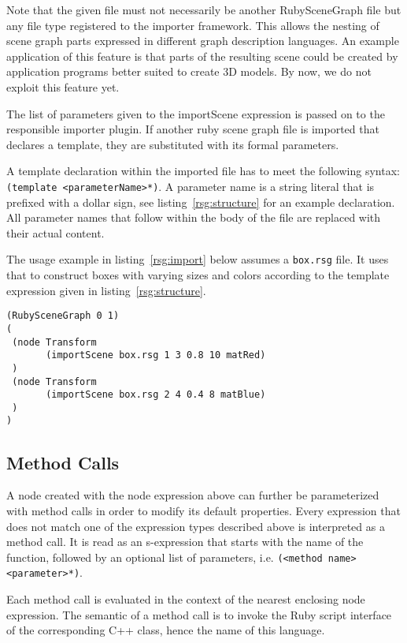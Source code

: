 Note that the given file must not necessarily be another
RubySceneGraph file but any file type registered to the importer
framework. This allows the nesting of scene graph parts expressed in
different graph description languages. An example application of this
feature is that parts of the resulting scene could be created by
application programs better suited to create 3D models. By now, we do
not exploit this feature yet.

The list of parameters given to the importScene expression is passed
on to the responsible importer plugin. If another ruby scene graph
file is imported that declares a template, they are substituted with
its formal parameters.

A template declaration within the imported file has to meet the
following syntax: \texttt{(template <parameterName>*)}. A parameter
name is a string literal that is prefixed with a dollar sign, see
listing~\ref{rsg:structure} for an example declaration. All parameter
names that follow within the body of the file are replaced with their
actual content.

The usage example in listing~\ref{rsg:import} below assumes a
\texttt{box.rsg} file. It uses that to construct boxes with varying
sizes and colors according to the template expression given in
listing~\ref{rsg:structure}.

\begin{lstlisting}[caption={importScene example}, label=rsg:import]
(RubySceneGraph 0 1)
(
 (node Transform 
       (importScene box.rsg 1 3 0.8 10 matRed)
 )
 (node Transform
       (importScene box.rsg 2 4 0.4 8 matBlue)
 )
)
\end{lstlisting}

\subsection{Method Calls}

A node created with the node expression above can further be
parameterized with method calls in order to modify its default
properties. Every expression that does not match one of the expression
types described above is interpreted as a method call. It is read as
an s-expression that starts with the name of the function, followed by
an optional list of parameters, i.e.  \texttt{(<method name>
  <parameter>*)}.

Each method call is evaluated in the context of the nearest enclosing
node expression. The semantic of a method call is to invoke the Ruby
script interface of the corresponding C++ class, hence the name of
this language.  

